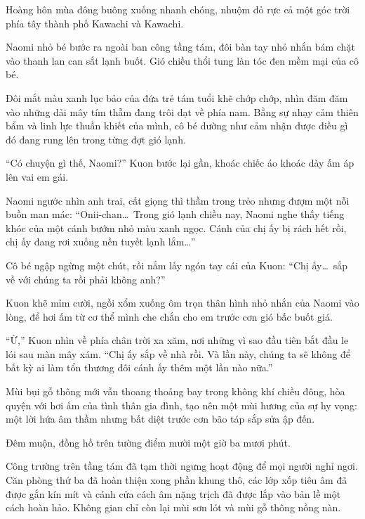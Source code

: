 ﻿\documentclass[../main.tex]{subfiles}
\begin{document}
\ct

Hoàng hôn mùa đông buông xuống nhanh chóng, nhuộm đỏ rực cả một góc trời phía tây thành phố Kawachi và Kawachi.

Naomi nhỏ bé bước ra ngoài ban công tầng tám, đôi bàn tay nhỏ nhắn bám chặt vào thanh lan can sắt lạnh buốt. Gió chiều thổi tung làn tóc đen mềm mại của cô bé.

Đôi mắt màu xanh lục bảo của đứa trẻ tám tuổi khẽ chớp chớp, nhìn đăm đăm vào những dải mây tím thẫm đang trôi dạt về phía nam. Bằng sự nhạy cảm thiên bẩm và linh lực thuần khiết của mình, cô bé dường như cảm nhận được điều gì đó đang rung lên trong từng đợt gió lạnh.

``Có chuyện gì thế, Naomi?'' Kuon bước lại gần, khoác chiếc áo khoác dày ấm áp lên vai em gái.

Naomi ngước nhìn anh trai, cất giọng thì thầm trong trẻo nhưng đượm một nỗi buồn man mác: ``Onii-chan\dots\ Trong gió lạnh chiều nay, Naomi nghe thấy tiếng khóc của một cánh bướm nhỏ màu xanh ngọc. Cánh của chị ấy bị rách hết rồi, chị ấy đang rơi xuống nền tuyết lạnh lắm\dots''

Cô bé ngập ngừng một chút, rồi nắm lấy ngón tay cái của Kuon: ``Chị ấy\dots\ sắp về với chúng ta rồi phải không anh?''

Kuon khẽ mỉm cười, ngồi xổm xuống ôm trọn thân hình nhỏ nhắn của Naomi vào lòng, để hơi ấm từ cơ thể mình che chắn cho em trước cơn gió bấc buốt giá.

``Ừ,'' Kuon nhìn về phía chân trời xa xăm, nơi những vì sao đầu tiên bắt đầu le lói sau màn mây xám. ``Chị ấy sắp về nhà rồi. Và lần này, chúng ta sẽ không để bất kỳ ai làm tổn thương đôi cánh ấy thêm một lần nào nữa.''

Mùi bụi gỗ thông mới vẫn thoang thoảng bay trong không khí chiều đông, hòa quyện với hơi ấm của tình thân gia đình, tạo nên một mùi hương của sự hy vọng: một lời hứa âm thầm nhưng bất diệt trước cơn bão táp sắp sửa ập đến.

\omk

Đêm muộn, đồng hồ trên tường điểm mười một giờ ba mươi phút.

Công trường trên tầng tám đã tạm thời ngưng hoạt động để mọi người nghỉ ngơi. Căn phòng thứ ba đã hoàn thiện xong phần khung thô, các lớp xốp tiêu âm đã được gắn kín mít và cánh cửa cách âm nặng trịch đã được lắp vào bản lề một cách hoàn hảo. Không gian chỉ còn lại mùi sơn lót và mùi gỗ thông nồng nàn.
\end{document}
